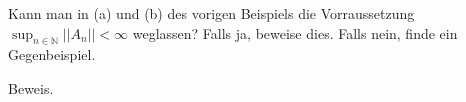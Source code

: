 \begin{exercise}
Kann man in (a) und (b) des vorigen Beispiels die Vorraussetzung
$\sup_{n \in \mathbb{N}} ||A_n|| < \infty$ weglassen?
Falls ja, beweise dies. Falls nein, finde ein Gegenbeispiel.
\end{exercise}
\begin{solution}
Beweis.

\end{solution}
